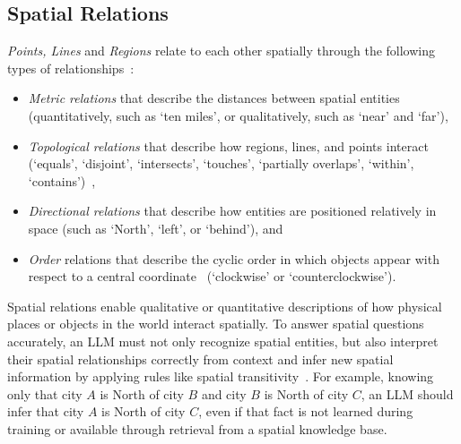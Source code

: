 \subsection{Spatial Relations}
\textit{Points, Lines} and \textit{Regions} relate to each other spatially through the following types of relationships~\cite{Carniel2020,Bertella2022,Carniel2023}: 
\begin{itemize}
    \item \textit{Metric relations} that describe the distances between spatial entities (quantitatively, such as `ten miles', or qualitatively, such as `near' and `far'),
    \item \textit{Topological relations} that describe how regions, lines, and points interact (`equals', `disjoint', `intersects', `touches', `partially overlaps', `within', `contains')~\cite{Minervino2023,Clementini1994,Strobl2008}, 
    \item \textit{Directional relations} that describe how entities are positioned relatively in space (such as `North', `left', or `behind'), and
    \item \textit{Order} relations that describe the cyclic order in which objects appear with respect to a central coordinate~\cite{Schwering2014} (`clockwise' or `counterclockwise').
\end{itemize}


%
Spatial relations enable qualitative or quantitative descriptions of how physical places or objects in the world interact spatially.
To answer spatial questions accurately, an LLM must not only recognize spatial entities, but also interpret their spatial relationships correctly from context and infer new spatial information by applying rules like spatial transitivity~\cite{Pears1990}.
For example, knowing only that city $A$ is North of city $B$ and city $B$ is North of city $C$, an LLM should infer that city $A$ is North of city $C$, even if that fact is not learned during training or available through retrieval from a spatial knowledge base.







